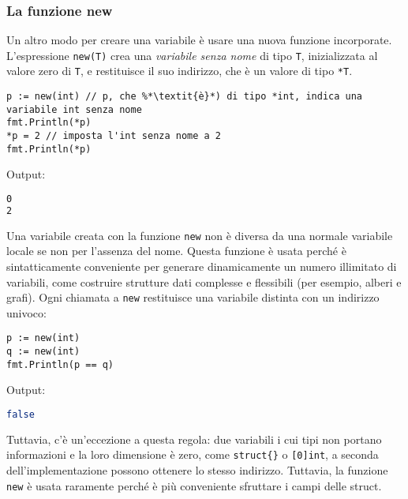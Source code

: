 \documentclass[../../../thesis.tex]{subfiles}
\begin{document}
    \subsubsection{La funzione new}
    Un altro modo per creare una variabile è usare una nuova funzione incorporate.
    L'espressione \verb"new(T)" crea una \textit{variabile senza nome} di tipo \verb"T", inizializzata al valore zero di \verb"T", e restituisce il suo indirizzo, che è un valore di tipo \verb"*T".
    \begin{lstlisting}[frame = single,label={lst:lstlisting1-3-3.1}]
p := new(int) // p, che %*\textit{è}*) di tipo *int, indica una variabile int senza nome
fmt.Println(*p)
*p = 2 // imposta l'int senza nome a 2
fmt.Println(*p)
    \end{lstlisting}
    Output:
    \begin{lstlisting}[language = bash, frame = L,label={lst:lstlisting1-3-3.2}]
0
2
    \end{lstlisting}
    Una variabile creata con la funzione \verb"new" non è diversa da una normale variabile locale se non per l'assenza del nome.
    Questa funzione è usata perché è sintatticamente conveniente per generare dinamicamente un numero illimitato di variabili, come costruire strutture dati complesse e flessibili (per esempio, alberi e grafi).
    Ogni chiamata a \verb"new" restituisce una variabile distinta con un indirizzo univoco:
    \begin{lstlisting}[frame = single,label={lst:lstlisting1-3-3.3}]
p := new(int)
q := new(int)
fmt.Println(p == q)
    \end{lstlisting}
    Output:
    \begin{lstlisting}[language = bash, frame = L,label={lst:lstlisting1-3-3.4}]
false
    \end{lstlisting}
    Tuttavia, c'è un'eccezione a questa regola: due variabili i cui tipi non portano informazioni e la loro dimensione è zero, come \verb"struct{}" o \verb"[0]int", a seconda dell'implementazione possono ottenere lo stesso indirizzo.
    Tuttavia, la funzione \verb"new" è usata raramente perché è più conveniente sfruttare i campi delle struct.
\end{document}
